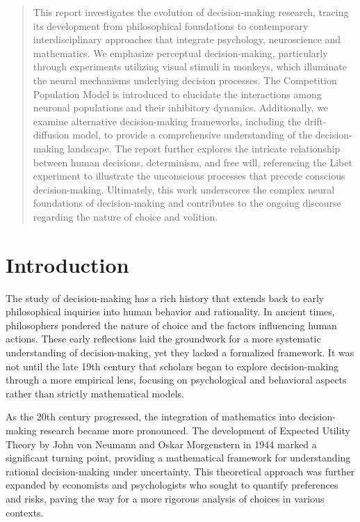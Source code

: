 \documentclass[12pt,hyperref,a4paper,UTF8]{ctexart}
\begin{document}
\cover

\newpage
\begin{abstract}
    This report investigates the evolution of decision-making research, tracing its development from philosophical foundations to contemporary interdisciplinary approaches that integrate psychology, neuroscience and mathematics. We emphasize perceptual decision-making, particularly through experiments utilizing visual stimuli in monkeys, which illuminate the neural mechanisms underlying decision processes. The Competition Population Model is introduced to elucidate the interactions among neuronal populations and their inhibitory dynamics. Additionally, we examine alternative decision-making frameworks, including the drift-diffusion model, to provide a comprehensive understanding of the decision-making landscape. The report further explores the intricate relationship between human decisions, determinism, and free will, referencing the Libet experiment to illustrate the unconscious processes that precede conscious decision-making. Ultimately, this work underscores the complex neural foundations of decision-making and contributes to the ongoing discourse regarding the nature of choice and volition.
\end{abstract}

\thispagestyle{empty} %

\newpage
\tableofcontents

\newpage
\section{Introduction}
The study of decision-making has a rich history that extends back to early philosophical inquiries into human behavior and rationality. In ancient times, philosophers pondered the nature of choice and the factors influencing human actions. These early reflections laid the groundwork for a more systematic understanding of decision-making, yet they lacked a formalized framework. It was not until the late 19th century that scholars began to explore decision-making through a more empirical lens, focusing on psychological and behavioral aspects rather than strictly mathematical models.

As the 20th century progressed, the integration of mathematics into decision-making research became more pronounced. The development of Expected Utility Theory by John von Neumann and Oskar Morgenstern in 1944 marked a significant turning point, providing a mathematical framework for understanding rational decision-making under uncertainty. This theoretical approach was further expanded by economists and psychologists who sought to quantify preferences and risks, paving the way for a more rigorous analysis of choices in various contexts.
\end{document}
